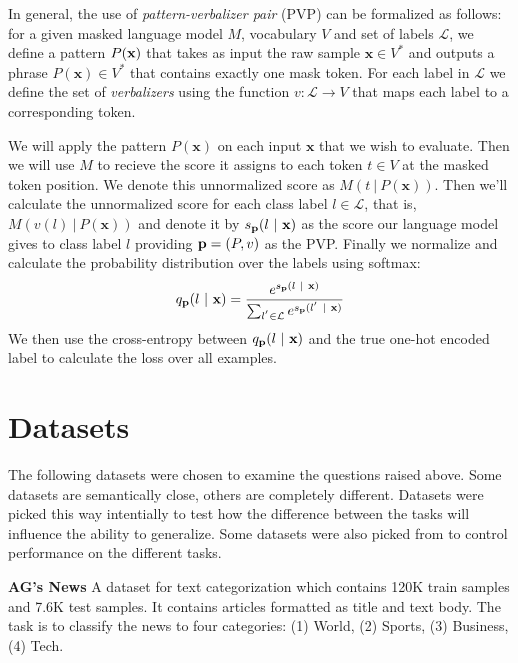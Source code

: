 \documentclass[11pt,a4paper]{article}
\begin{document}
In general, the use of \textit{pattern-verbalizer pair} (PVP) can be formalized as follows: for a given masked language model $M$, vocabulary $V$ and set of labels $\mathcal{L}$, we define a pattern $P(\textbf{\text{x}})$ that takes as input the raw sample $\textbf{x}\in{}V^*$ and outputs a phrase $P(\textbf{x})\in{}V^*$ that contains exactly one mask token.
For each label in $\mathcal{L}$ we define the set of \textit{verbalizers} using the function $v:\mathcal{L}\rightarrow{}V$ that maps each label to a corresponding token.

We will apply the pattern $P(\textbf{x})$ on each input $\textbf{x}$ that we wish to evaluate.
Then we will use $M$ to recieve the score it assigns to each token $t\in{}V$ at the masked token position.
We denote this unnormalized score as $M(t\ |\ P(\textbf{x}))$.
Then we'll calculate the unnormalized score for each class label $l\in{}\mathcal{L}$, that is, $M(v(l)\ |\ P(\textbf{x}))$ and denote it by $s_{\text{\textbf{p}}}(l\ |\ \textbf{x})$ as the score our language model gives to class label $l$ providing $\text{\textbf{p}}=(P, v)$ as the PVP.
Finally we normalize and calculate the probability distribution over the labels using softmax:
\[
	q_\text{\textbf{p}}(l\ |\ \textbf{x}) = \frac{e^{s_{\text{\textbf{p}}}(l\ |\ \textbf{x})}}{\sum_{l^{'}\in{}\mathcal{L}}e^{s_{\text{\textbf{p}}}(l^{'}\ |\ \textbf{x})}}
\]
We then use the cross-entropy between $q_\text{\textbf{p}}(l\ |\ \textbf{x})$ and the true one-hot encoded label to calculate the loss over all examples. 

\section{Datasets}

The following datasets were chosen to examine the questions raised above.
Some datasets are semantically close, others are completely different.
Datasets were picked this way intentially to test how the difference between the tasks will influence the ability to generalize. 
Some datasets were also picked from \citet{schick2020exploiting} to control performance on the different tasks.

\vspace{8pt}
\noindent \textbf{AG's News} \quad
A dataset for text categorization which contains 120K train samples and 7.6K test samples.
It contains articles formatted as title and text body.
The task is to classify the news to four categories: (1) World, (2) Sports, (3) Business, (4) Tech.
\end{document}

